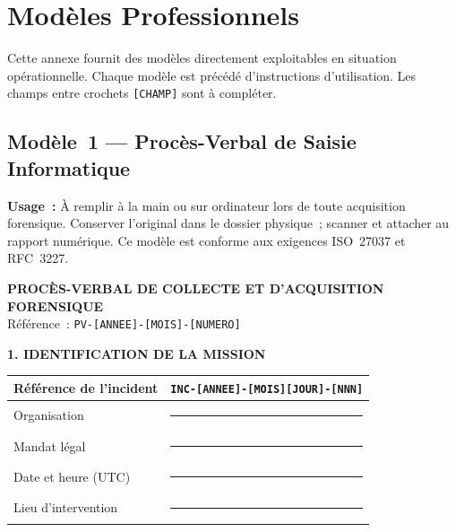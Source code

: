 
\chapter{Modèles Professionnels}
\label{ann:templates}

\begin{boxinfo}
Cette annexe fournit des modèles directement exploitables en situation
opérationnelle. Chaque modèle est précédé d'instructions d'utilisation.
Les champs entre crochets \texttt{[CHAMP]} sont à compléter.
\end{boxinfo}

\section{Modèle~1 — Procès-Verbal de Saisie Informatique}
\label{ann:tpl-pv}

\begin{boxinfo}
\textbf{Usage~:} À remplir à la main ou sur ordinateur lors de toute
acquisition forensique. Conserver l'original dans le dossier physique~;
scanner et attacher au rapport numérique. Ce modèle est conforme aux
exigences ISO~27037 et RFC~3227.
\end{boxinfo}

\medskip
\begin{center}
{\large\bfseries\color{CouleurPrimaire}
PROCÈS-VERBAL DE COLLECTE ET D'ACQUISITION FORENSIQUE}\\[0.5ex]
{\small Référence~: \texttt{PV-[ANNEE]-[MOIS]-[NUMERO]}}
\end{center}

\bigskip

\textbf{1. IDENTIFICATION DE LA MISSION}

\begin{table}[H]\centering\small
\begin{tabular}{p{5cm}p{8.5cm}}
\toprule
Référence de l'incident & \texttt{INC-[ANNEE]-[MOIS][JOUR]-[NNN]} \\
\midrule
Organisation & \rule{8.5cm}{0.4pt} \\
Mandat légal & \rule{8.5cm}{0.4pt} \\
Date et heure (UTC) & \rule{8.5cm}{0.4pt} \\
Lieu d'intervention & \rule{8.5cm}{0.4pt} \\
\bottomrule
\end{tabular}
\end{table}

